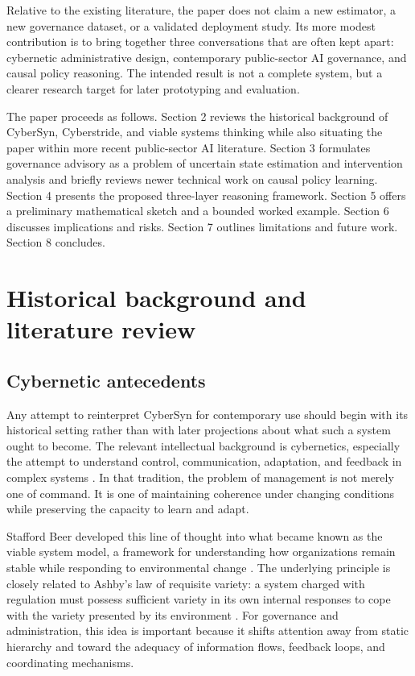 \documentclass[11pt]{article}
\begin{document}
Relative to the existing literature, the paper does not claim a new estimator, a new governance dataset, or a validated deployment study. Its more modest contribution is to bring together three conversations that are often kept apart: cybernetic administrative design, contemporary public-sector AI governance, and causal policy reasoning. The intended result is not a complete system, but a clearer research target for later prototyping and evaluation.

The paper proceeds as follows. Section 2 reviews the historical background of CyberSyn, Cyberstride, and viable systems thinking while also situating the paper within more recent public-sector AI literature. Section 3 formulates governance advisory as a problem of uncertain state estimation and intervention analysis and briefly reviews newer technical work on causal policy learning. Section 4 presents the proposed three-layer reasoning framework. Section 5 offers a preliminary mathematical sketch and a bounded worked example. Section 6 discusses implications and risks. Section 7 outlines limitations and future work. Section 8 concludes.

\section{Historical background and literature review}

\subsection{Cybernetic antecedents}

Any attempt to reinterpret CyberSyn for contemporary use should begin with its historical setting rather than with later projections about what such a system ought to become. The relevant intellectual background is cybernetics, especially the attempt to understand control, communication, adaptation, and feedback in complex systems \citep{ashby1956, beer1956}. In that tradition, the problem of management is not merely one of command. It is one of maintaining coherence under changing conditions while preserving the capacity to learn and adapt.

Stafford Beer developed this line of thought into what became known as the viable system model, a framework for understanding how organizations remain stable while responding to environmental change \citep{beer1972}. The underlying principle is closely related to Ashby's law of requisite variety: a system charged with regulation must possess sufficient variety in its own internal responses to cope with the variety presented by its environment \citep{ashby1956}. For governance and administration, this idea is important because it shifts attention away from static hierarchy and toward the adequacy of information flows, feedback loops, and coordinating mechanisms.
\end{document}
